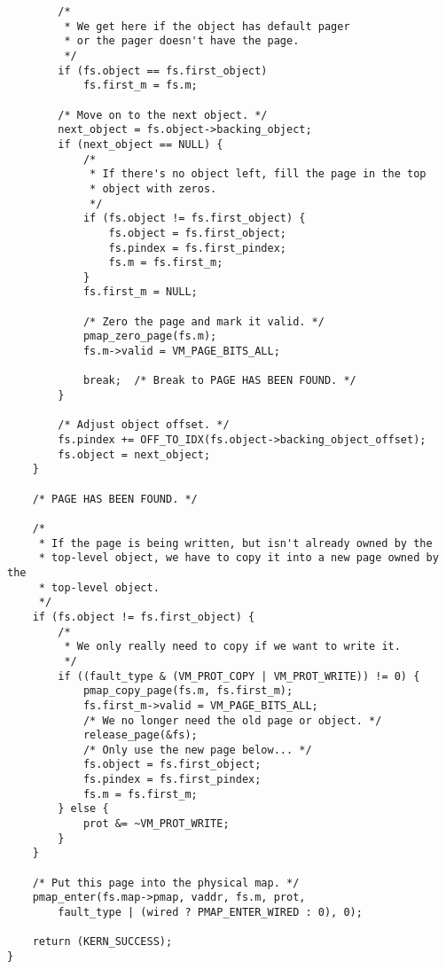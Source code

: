\documentclass[shortabstract, english]{iithesis}
\newenvironment{code}{}{}
\begin{document}
\begin{code}
\begin{verbatim}
        /*
         * We get here if the object has default pager
         * or the pager doesn't have the page.
         */
        if (fs.object == fs.first_object)
            fs.first_m = fs.m;

        /* Move on to the next object. */
        next_object = fs.object->backing_object;
        if (next_object == NULL) {
            /*
             * If there's no object left, fill the page in the top
             * object with zeros.
             */
            if (fs.object != fs.first_object) {
                fs.object = fs.first_object;
                fs.pindex = fs.first_pindex;
                fs.m = fs.first_m;
            }
            fs.first_m = NULL;

            /* Zero the page and mark it valid. */
            pmap_zero_page(fs.m);
            fs.m->valid = VM_PAGE_BITS_ALL;

            break;  /* Break to PAGE HAS BEEN FOUND. */
        }

        /* Adjust object offset. */
        fs.pindex += OFF_TO_IDX(fs.object->backing_object_offset);
        fs.object = next_object;
    }

    /* PAGE HAS BEEN FOUND. */

    /*
     * If the page is being written, but isn't already owned by the
     * top-level object, we have to copy it into a new page owned by the
     * top-level object.
     */
    if (fs.object != fs.first_object) {
        /*
         * We only really need to copy if we want to write it.
         */
        if ((fault_type & (VM_PROT_COPY | VM_PROT_WRITE)) != 0) {
            pmap_copy_page(fs.m, fs.first_m);
            fs.first_m->valid = VM_PAGE_BITS_ALL;
            /* We no longer need the old page or object. */
            release_page(&fs);
            /* Only use the new page below... */
            fs.object = fs.first_object;
            fs.pindex = fs.first_pindex;
            fs.m = fs.first_m;
        } else {
            prot &= ~VM_PROT_WRITE;
        }
    }

    /* Put this page into the physical map. */
    pmap_enter(fs.map->pmap, vaddr, fs.m, prot,
        fault_type | (wired ? PMAP_ENTER_WIRED : 0), 0);

    return (KERN_SUCCESS);
}
\end{verbatim}
\end{code}
\end{document}
